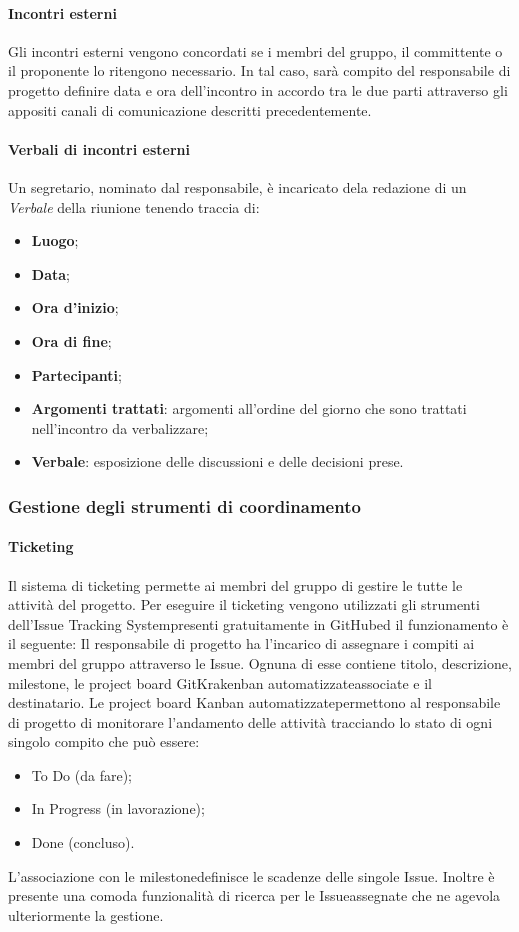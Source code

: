 			\paragraph*{Incontri esterni}
				Gli incontri esterni vengono concordati se i membri del gruppo, il committente o il proponente lo ritengono necessario. In tal caso, sarà compito del responsabile di progetto definire data e ora dell'incontro in accordo tra le due parti attraverso gli appositi canali di comunicazione descritti precedentemente.
			\paragraph*{Verbali di incontri esterni}
				Un segretario, nominato dal responsabile, è incaricato dela redazione di un \textit{Verbale} della riunione tenendo traccia di:
				\begin{itemize}
					\item \textbf{Luogo};
					\item \textbf{Data};
					\item \textbf{Ora d'inizio};
					\item \textbf{Ora di fine};
					\item \textbf{Partecipanti};
					\item \textbf{Argomenti trattati}: argomenti all'ordine del giorno che sono trattati nell'incontro da verbalizzare;
					\item \textbf{Verbale}: esposizione delle discussioni e delle decisioni prese.
				\end{itemize}
		\subsubsection{Gestione degli strumenti di coordinamento}
			\paragraph*{Ticketing}
				Il sistema di ticketing permette ai membri del gruppo di gestire le tutte le attività del progetto.
				Per eseguire il ticketing vengono utilizzati gli strumenti dell'Issue Tracking System\glosp presenti gratuitamente in GitHub\glosp ed il funzionamento è il seguente:
				Il responsabile di progetto ha l'incarico di assegnare i compiti ai membri del gruppo attraverso le Issue\glosp. Ognuna di esse contiene titolo, descrizione, milestone\glosp, le project board GitKrakenban automatizzate\glosp associate e il destinatario.
				Le project board Kanban automatizzate\glosp permettono al responsabile di progetto di monitorare l'andamento delle attività tracciando lo stato di ogni singolo compito che può essere:
				\begin{itemize}
					\item To Do (da fare);
					\item In Progress (in lavorazione);
					\item Done (concluso).
				\end{itemize}
				L'associazione con le milestone\glosp definisce le scadenze delle singole Issue\glosp.
				Inoltre è presente una comoda funzionalità di ricerca per le Issue\glosp assegnate che ne agevola ulteriormente la gestione.
